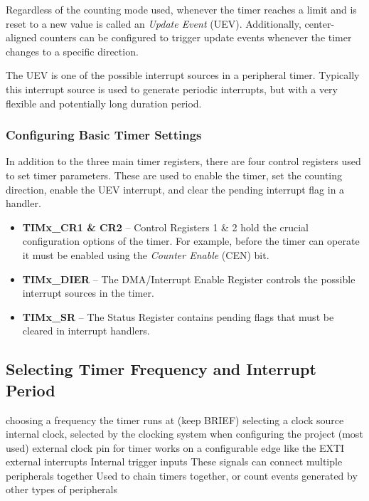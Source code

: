 \documentclass[11pt,fleqn]{book} %
\begin{document}
    Regardless of the counting mode used, whenever the timer reaches a limit and is reset to a new value is called an \textit{Update Event} (UEV). Additionally, center-aligned counters can be configured to trigger update events whenever the timer changes to a specific direction. 
    
    The UEV is one of the possible interrupt sources in a peripheral timer. Typically this interrupt source is used to generate periodic interrupts, but with a very flexible and potentially long duration period. 
    
    
    \subsubsection{Configuring Basic Timer Settings}
    In addition to the three main timer registers, there are four control registers used to set timer parameters. These are used to enable the timer, set the counting direction, enable the UEV interrupt, and clear the pending interrupt flag in a handler. 
    
    \begin{itemize}
        \item \textbf{TIMx\_CR1 \& CR2} -- Control Registers 1 \& 2 hold the crucial configuration options of the timer. For example, before the timer can operate it must be enabled using the \textit{Counter Enable} (CEN) bit. 
        \item\textbf{TIMx\_DIER} -- The DMA/Interrupt Enable Register controls the possible interrupt sources in the timer.
        \item\textbf{TIMx\_SR} -- The Status Register contains pending flags that must be cleared in interrupt handlers.
    \end{itemize}
    
    
    
    \subsection{Selecting Timer Frequency and Interrupt Period}	
    choosing a frequency the timer runs at (keep BRIEF)
    selecting a clock source
        internal clock, selected by the clocking system when configuring the project (most used)
        external clock pin for timer
            works on a configurable edge like the EXTI external interrupts
        Internal trigger inputs
            These signals can connect multiple peripherals together
            Used to chain timers together, or count events generated by other types of peripherals
    
\end{document}

